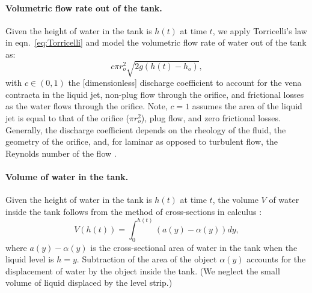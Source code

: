 \documentclass[openacc]{rsproca_new}%
\begin{document}
\paragraph{Volumetric flow rate out of the tank.} Given the height of water in the tank is $h(t)$ at time $t$, we apply Torricelli's law in eqn.~\ref{eq:Torricelli} and model the volumetric flow rate of water out of the tank as:
\begin{equation}
	c \pi r_o^2 \sqrt{2 g(h(t)-h_o)}, \label{eq:outletflow}
\end{equation}
with $c\in(0,1)$ the [dimensionless] discharge coefficient to account for the vena contracta in the liquid jet, non-plug flow through the orifice, and frictional losses as the water flows through the orifice. 
Note, $c=1$ assumes the area of the liquid jet is equal to that of the orifice ($\pi r_o^2$), plug flow, and zero frictional losses.
Generally, the discharge coefficient depends on the rheology of the fluid, the geometry of the orifice, and, for laminar as opposed to turbulent flow, the Reynolds number of the flow \cite{teoman2022discharge}. 
\cite{horsch2020simple,teoman2022discharge,hicks2014determining,blasone2015discharge,lienhard1984velocity,wadhwa2021study}

\paragraph{Volume of water in the tank.} Given the height of water in the tank is $h(t)$ at time $t$, the volume $V$ of water inside the tank follows from the method of cross-sections in calculus \cite{debook}:
\begin{equation}
	V(h(t))=\int_0^{h(t)} \left(a(y) - \alpha(y) \right) dy, \label{eq:volume}
\end{equation}
where $a(y)-\alpha(y)$ is the cross-sectional area of water in the tank when the liquid level is $h=y$. Subtraction of the area of the object $\alpha(y)$ accounts for the displacement of water by the object inside the tank. 
(We neglect the small volume of liquid displaced by the level strip.)
\end{document}
